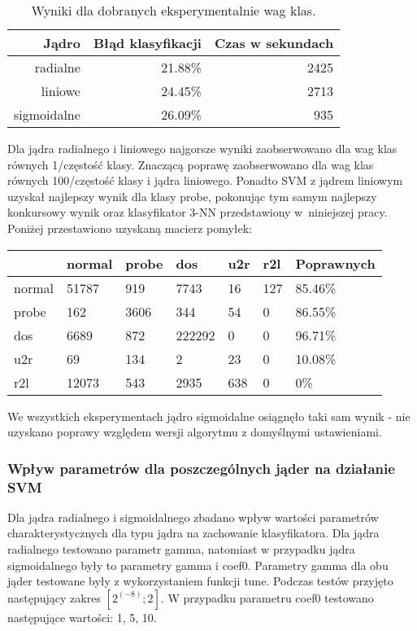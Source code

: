 \documentclass[a4paper, 12pt]{article}
\begin{document}
\begin{table}[H]
\centering
\begin{tabular}{ | r | r | r | } \hline
Jądro & Błąd klasyfikacji & Czas w sekundach \\ \hline
radialne & 21.88\% & 2425 \\ \hline
liniowe & 24.45\% & 2713 \\ \hline
sigmoidalne & 26.09\% & 935 \\ \hline
\end{tabular} 
\caption{Wyniki dla dobranych eksperymentalnie wag klas.}
\end{table}

Dla jądra radialnego i liniowego najgorsze wyniki zaobserwowano dla wag klas równych 1/częstość klasy. Znaczącą poprawę zaobserwowano dla wag klas równych 100/częstość klasy i jądra liniowego. Ponadto SVM z jądrem liniowym uzyskał najlepszy wynik dla klasy probe, pokonując tym samym najlepszy konkursowy wynik oraz klasyfikator 3-NN przedstawiony w~niniejszej pracy. Poniżej przestawiono uzyskaną macierz pomyłek:
\begin{table}[H]
\centering
\begin{tabular}{ | l | l | l | l | l | l | l | } \hline
	& normal & probe & dos 	& u2r 	& r2l 	& Poprawnych	\\ \hline
normal &  51787 &  919 & 7743  &  16 & 127  & 85.46\% \\ \hline
probe  &  162 & 3606 &   344 &   54 &   0 & 86.55\% \\ \hline
dos    &  6689 &  872 & 222292 &   0 &  0 & 96.71\% \\ \hline
u2r    &    69 &  134 &  2 &  23 &  0 & 10.08\% \\ \hline
r2l    &  12073 &  543 &   2935 & 638 &  0 & 0\% \\ \hline
\end{tabular} 
\end{table}
We wszystkich eksperymentach jądro sigmoidalne osiągnęło taki sam wynik - nie uzyskano poprawy względem wersji algorytmu z domyślnymi ustawieniami.

\subsubsection{Wpływ parametrów dla poszczególnych jąder na działanie SVM}
Dla jądra radialnego i sigmoidalnego zbadano wpływ wartości parametrów charakterystycznych dla typu jądra na zachowanie klasyfikatora. Dla jądra radialnego testowano parametr gamma, natomiast w przypadku jądra sigmoidalnego były to parametry gamma i coef0. 
Parametry gamma dla obu jąder testowane były z wykorzystaniem funkcji tune. Podczas testów przyjęto następujący zakres $[2^{(-8)};2]$. W przypadku parametru coef0 testowano następujące wartości: 1, 5, 10.
\end{document}
